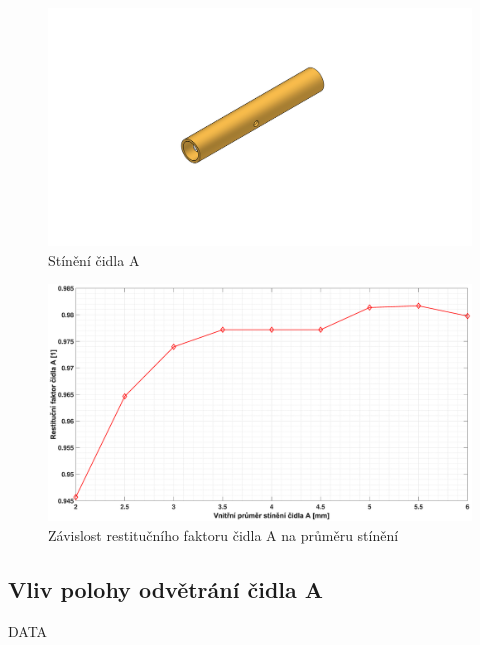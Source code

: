         \begin{figure}[ht!]
            \centering
            \includegraphics[width=\textwidth]{400_SIMULACE_KONSTRUKCNICH_UPRAV/Vykresy_rendery/Stineni_A.png}
            \caption{Stínění čidla A}
            \label{fig:stineni-A}
        \end{figure}
        
        \begin{figure}[ht!]
            \centering
            \includegraphics*[width=\textwidth, trim={5.25cm 1.0cm 5.8cm 2.0cm}]{400_SIMULACE_KONSTRUKCNICH_UPRAV/Grafy/05_prumer_stineni_A}
            \caption{Závislost restitučního faktoru čidla A na průměru stínění}
            \label{fig:prumer-stineni-A}
        \end{figure}
    
   \newpage
     \subsection{Vliv polohy odvětrání čidla A}
        DATA
        
